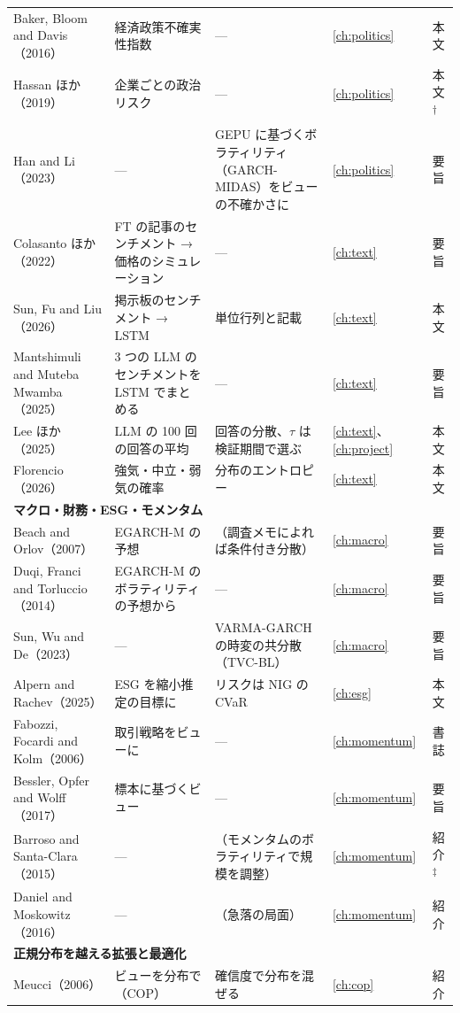 \begin{longtable}{p{2.8cm}p{3.7cm}p{4.0cm}p{0.9cm}p{0.8cm}}
Baker, Bloom and Davis（2016） & 経済政策不確実性指数 & --- & \ref{ch:politics} & 本文 \\
Hassan ほか（2019） & 企業ごとの政治リスク & --- & \ref{ch:politics} & 本文\textsuperscript{†} \\
Han and Li（2023） & --- & GEPU に基づくボラティリティ（GARCH-MIDAS）をビューの不確かさに & \ref{ch:politics} & 要旨 \\
Colasanto ほか（2022） & FT の記事のセンチメント → 価格のシミュレーション & --- & \ref{ch:text} & 要旨 \\
Sun, Fu and Liu（2026） & 掲示板のセンチメント → LSTM & 単位行列と記載 & \ref{ch:text} & 本文 \\
Mantshimuli and Muteba Mwamba（2025） & 3 つの LLM のセンチメントを LSTM でまとめる & --- & \ref{ch:text} & 要旨 \\
Lee ほか（2025） & LLM の 100 回の回答の平均 & 回答の分散、$\tau$ は検証期間で選ぶ & \ref{ch:text}、\ref{ch:project} & 本文 \\
Florencio（2026） & 強気・中立・弱気の確率 & 分布のエントロピー & \ref{ch:text} & 本文 \\
\multicolumn{5}{l}{\textbf{マクロ・財務・ESG・モメンタム}}\\
Beach and Orlov（2007） & EGARCH-M の予想 & （調査メモによれば条件付き分散） & \ref{ch:macro} & 要旨 \\
Duqi, Franci and Torluccio（2014） & EGARCH-M のボラティリティの予想から & --- & \ref{ch:macro} & 要旨 \\
Sun, Wu and De（2023） & --- & VARMA-GARCH の時変の共分散（TVC-BL） & \ref{ch:macro} & 要旨 \\
Alpern and Rachev（2025） & ESG を縮小推定の目標に & リスクは NIG の CVaR & \ref{ch:esg} & 本文 \\
Fabozzi, Focardi and Kolm（2006） & 取引戦略をビューに & --- & \ref{ch:momentum} & 書誌 \\
Bessler, Opfer and Wolff（2017） & 標本に基づくビュー & --- & \ref{ch:momentum} & 要旨 \\
Barroso and Santa-Clara（2015） & --- & （モメンタムのボラティリティで規模を調整） & \ref{ch:momentum} & 紹介\textsuperscript{‡} \\
Daniel and Moskowitz（2016） & --- & （急落の局面） & \ref{ch:momentum} & 紹介 \\
\multicolumn{5}{l}{\textbf{正規分布を越える拡張と最適化}}\\
Meucci（2006） & ビューを分布で（COP） & 確信度で分布を混ぜる & \ref{ch:cop} & 紹介 \\

\end{longtable}
